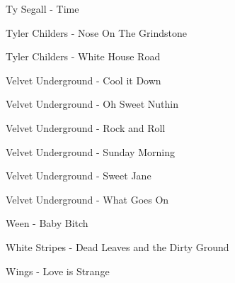 Ty Segall - Time \dotfill \pageref{Time - Ty Segall} 

Tyler Childers - Nose On The Grindstone \dotfill \pageref{Nose On The Grindstone - Tyler Childers} 

Tyler Childers - White House Road \dotfill \pageref{White House Road - Tyler Childers} 

Velvet Underground - Cool it Down \dotfill \pageref{Cool it Down - Velvet Underground} 

Velvet Underground - Oh Sweet Nuthin \dotfill \pageref{Oh Sweet Nuthin - Velvet Underground} 

Velvet Underground - Rock and Roll \dotfill \pageref{Rock and Roll - Velvet Underground} 

Velvet Underground - Sunday Morning \dotfill \pageref{Sunday Morning - Velvet Underground} 

Velvet Underground - Sweet Jane \dotfill \pageref{Sweet Jane - Velvet Underground} 

Velvet Underground - What Goes On \dotfill \pageref{What Goes On - Velvet Underground} 

Ween - Baby Bitch \dotfill \pageref{Baby Bitch - Ween} 

White Stripes - Dead Leaves and the Dirty Ground \dotfill \pageref{Dead Leaves and the Dirty Ground - White Stripes} 

Wings - Love is Strange \dotfill \pageref{Love is Strange - Wings} 

